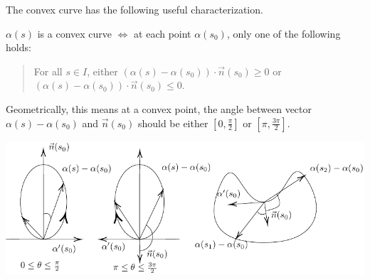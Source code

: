 The convex curve has the following useful characterization.
\begin{proposition}
    $\alpha(s)$ is a convex curve $\Leftrightarrow $ at each point $\alpha(s_0)$, only one of the following holds:
    \begin{quotation}
        For all $s\in I$, either $(\alpha(s)-\alpha(s_0))\cdot \vec{n}(s_0)\ge 0$ or $(\alpha(s)-\alpha(s_0))\cdot \vec{n}(s_0)\le 0$.
    \end{quotation}
    Geometrically, this means at a convex point, the angle between vector $\alpha(s)-\alpha(s_0)$ and $\vec{n}(s_0)$ should be either $[0,\frac{\pi}{2}]$ or $[\pi,\frac{3\pi}{2}]$.
\end{proposition}
\begin{example}\hfill
    \begin{center}
        \includegraphics{picture/week3/example convex curves.pdf}
    \end{center}

\end{example}

